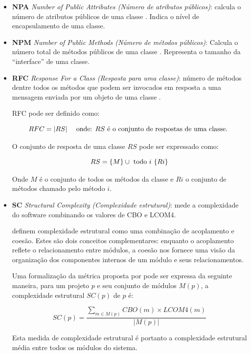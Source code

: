 \begin{itemize}
  \item {\bf NPA} {\it Number of Public Attributes (Número de atributos
    públicos)}: calcula o número de atributos públicos de uma classe
    \cite{Jagdish1997}. Indica o nível de encapsulamento de uma classe.

  \item {\bf NPM} {\it Number of Public Methods (Número de métodos públicos)}:
    Calcula o número total de métodos públicos de uma classe \cite{Jagdish1997}.
    Representa o tamanho da ``interface'' de uma classe.

  \item {\bf RFC} {\it Response For a Class (Resposta para uma classe)}:
    número de métodos dentre todos os métodos que podem ser invocados em
    resposta a uma mensagem enviada por um objeto de uma classe
    \cite{Chidamber1991}.

RFC pode ser definido como:

\begin{equation}
RFC = | RS | \quad \text{ onde: $ RS $ é o conjunto de respostas de uma classe. }
\end{equation}

O conjunto de resposta de uma classe $ RS $ pode ser expressado como:

\begin{equation}
RS = \{ M \} \cup \text{ todo $ i $ } \{ Ri \}
\end{equation}

Onde $ M $ é o conjunto de todos os métodos da classe e $ Ri $ o conjunto de
métodos chamado pelo método $ i $.

  \item {\bf SC} {\it Structural Complexity (Complexidade estrutural)}: mede a
    complexidade do software \cite{Darcy2005} combinando os valores de CBO e LCOM4.

 definem complexidade estrutural como uma combinação de
acoplamento e coesão. Estes são dois conceitos complementares: enquanto o
acoplamento reflete o relacionamento entre módulos, a coesão nos fornece uma
visão da organização dos componentes internos de um módulo e seus
relacionamentos.

Uma formalização da métrica proposta por  pode ser
expressa da seguinte maneira, para um projeto $p$ e seu conjunto de módulos
$M(p)$, a complexidade estrutural $SC(p)$ de $p$ é:

\begin{equation}
SC(p) = \frac
{ \displaystyle \sum_{m \in M(p)} CBO(m) \times LCOM4(m) }
{ |M(p)| }
\end{equation}

Esta medida de complexidade estrutural é portanto a complexidade
estrutural média entre todos os módulos do sistema.

\end{itemize}

